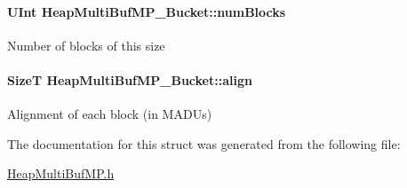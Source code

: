 \paragraph[{numBlocks}]{\setlength{\rightskip}{0pt plus 5cm}UInt {\bf HeapMultiBufMP\_\-Bucket::numBlocks}}\hfill\label{struct_heap_multi_buf_m_p___bucket_aae58960c7220dbf07d8eb41f09083b1c}
Number of blocks of this size 
\paragraph[{align}]{\setlength{\rightskip}{0pt plus 5cm}SizeT {\bf HeapMultiBufMP\_\-Bucket::align}}\hfill\label{struct_heap_multi_buf_m_p___bucket_a0ca1421d9f65451f797e07811cefd80a}
Alignment of each block (in MADUs) 

The documentation for this struct was generated from the following file:\begin{DoxyCompactItemize}
\item 
\hyperlink{_heap_multi_buf_m_p_8h}{HeapMultiBufMP.h}\end{DoxyCompactItemize}
